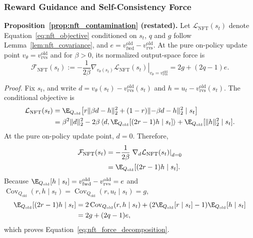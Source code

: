 \documentclass{article}
\begin{document}
\subsubsection{Reward Guidance and Self-Consistency Force}
\noindent\textbf{Proposition~\ref{prop:nft_contamination} (restated).}
Let $\mathcal L_{\mathrm{NFT}}(s_t)$ denote
Equation~\ref{eq:nft_objective} conditioned on $s_t$, $q$ and $g$ follow Lemma~\ref{lem:nft_covariance}, and $e=v_{\mathrm{fwd}}^{\mathrm{old}}-v_{\mathrm{rvs}}^{\mathrm{old}}$. At the pure on-policy
update point $v_\theta=v_{\mathrm{rvs}}^{\mathrm{old}}$ and for $\beta>0$,
its normalized output-space force is
\begin{equation*}
\mathcal F_{\mathrm{NFT}}(s_t)
:=-\frac{1}{2\beta}
\left.\nabla_{v_\theta(s_t)}\mathcal L_{\mathrm{NFT}}(s_t)
\right|_{v_\theta=v_{\mathrm{rvs}}^{\mathrm{old}}}
=2g+(2q-1)e.
\end{equation*}

\noindent\textit{Proof.} 
Fix $s_t$, and write
$d=v_\theta(s_t)-v_{\mathrm{rvs}}^{\mathrm{old}}(s_t)$ and
$h=u_t-v_{\mathrm{rvs}}^{\mathrm{old}}(s_t)$. The conditional objective is
\begin{align}
\mathcal L_{\mathrm{NFT}}(s_t)
&=\E_{Q_{\mathrm{old}}}\!\left[r\lVert\beta d-h\rVert_2^2
 +(1-r)\lVert-\beta d-h\rVert_2^2\mid s_t\right]\\
&=\beta^2\lVert d\rVert_2^2
-2\beta\left\langle d,
\E_{Q_{\mathrm{old}}}[(2r-1)h\mid s_t]\right\rangle
+\E_{Q_{\mathrm{old}}}[\lVert h\rVert_2^2\mid s_t].
\end{align}
At the pure on-policy update point, $d=0$. Therefore,
\begin{align}
\mathcal F_{\mathrm{NFT}}(s_t)
&=-\frac{1}{2\beta}
\left.\nabla_d\mathcal L_{\mathrm{NFT}}(s_t)\right|_{d=0}\\
&=\E_{Q_{\mathrm{old}}}[(2r-1)h\mid s_t].
\end{align}
Because $\E_{Q_{\mathrm{old}}}[h\mid s_t]
=v_{\mathrm{fwd}}^{\mathrm{old}}-v_{\mathrm{rvs}}^{\mathrm{old}}=e$ and
$\operatorname{Cov}_{Q_{\mathrm{old}}}(r,h\mid s_t)
=\operatorname{Cov}_{Q_{\mathrm{old}}}(r,u_t\mid s_t)=g$,
\begin{align}
\E_{Q_{\mathrm{old}}}[(2r-1)h\mid s_t]
&=2\operatorname{Cov}_{Q_{\mathrm{old}}}(r,h\mid s_t)
 +(2\E_{Q_{\mathrm{old}}}[r\mid s_t]-1)
 \E_{Q_{\mathrm{old}}}[h\mid s_t]\\
&=2g+(2q-1)e,
\end{align}
which proves Equation~\ref{eq:nft_force_decomposition}.
\end{document}
